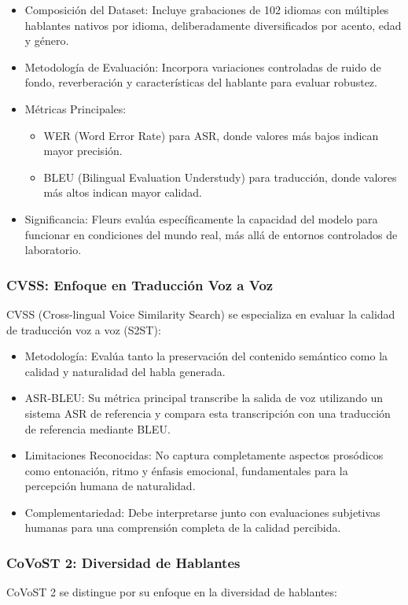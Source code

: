 \begin{itemize}
    \item Composición del Dataset: Incluye grabaciones de 102 idiomas con múltiples hablantes nativos por idioma, deliberadamente diversificados por acento, edad y género.
    \item Metodología de Evaluación: Incorpora variaciones controladas de ruido de fondo, reverberación y características del hablante para evaluar robustez.
    \item Métricas Principales:
        \begin{itemize}
            \item WER (Word Error Rate) para ASR, donde valores más bajos indican mayor precisión.
            \item BLEU (Bilingual Evaluation Understudy) para traducción, donde valores más altos indican mayor calidad.
        \end{itemize}
    \item Significancia: Fleurs evalúa específicamente la capacidad del modelo para funcionar en condiciones del mundo real, más allá de entornos controlados de laboratorio.
\end{itemize}

\subsubsection{CVSS: Enfoque en Traducción Voz a Voz}
CVSS (Cross-lingual Voice Similarity Search) se especializa en evaluar la calidad de traducción voz a voz (S2ST):

\begin{itemize}
    \item Metodología: Evalúa tanto la preservación del contenido semántico como la calidad y naturalidad del habla generada.
    \item ASR-BLEU: Su métrica principal transcribe la salida de voz utilizando un sistema ASR de referencia y compara esta transcripción con una traducción de referencia mediante BLEU.
    \item Limitaciones Reconocidas: No captura completamente aspectos prosódicos como entonación, ritmo y énfasis emocional, fundamentales para la percepción humana de naturalidad.
    \item Complementariedad: Debe interpretarse junto con evaluaciones subjetivas humanas para una comprensión completa de la calidad percibida.
\end{itemize}

\subsubsection{CoVoST 2: Diversidad de Hablantes}
CoVoST 2 se distingue por su enfoque en la diversidad de hablantes:

